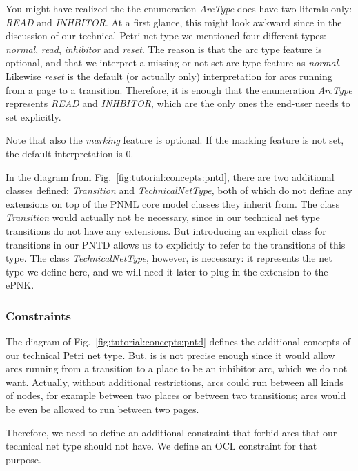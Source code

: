 You might have realized the the enumeration \emph{ArcType} does have two
literals only: \emph{READ} and \emph{INHBITOR}. At a first glance, this might
look awkward since in the discussion of our technical Petri net type we
mentioned four different types: \emph{normal}, \emph{read}, \emph{inhibitor} and
\emph{reset}. The reason is that the arc type feature is optional, and that we
interpret a missing or not set arc type feature as \emph{normal}. Likewise
\emph{reset} is the default (or actually only) interpretation for arcs
running from a page to a transition. Therefore, it is enough that the
enumeration \emph{ArcType} represents \emph{READ} and \emph{INHBITOR}, which are
the only ones the end-user needs to set explicitly.

Note that also the \emph{marking} feature is optional. If the marking feature
is not set, the default interpretation is $0$.

In the diagram from Fig.~\ref{fig:tutorial:concepts:pntd}, there are two
additional classes defined: \emph{Transition} and \emph{TechnicalNetType},
both of which do not define any extensions on top of the PNML core model
classes they inherit from. The class \emph{Transition} would actually not be
necessary, since in our technical net type transitions do not have any
extensions. But introducing an explicit class for transitions in our PNTD allows
us to explicitly to refer to the transitions of this type. The class
\emph{TechnicalNetType}, however, is necessary: it represents the net type we
define here, and we will need it later to plug in the extension to the ePNK.

\subsubsection{Constraints}
\label{subsubsec:tutorial:concepts:constraints}

The diagram of Fig.~\ref{fig:tutorial:concepts:pntd} defines the additional
concepts of our technical Petri net type. But, is is not precise enough since
it would allow arcs running from a transition to a place to be an inhibitor
arc, which we do not want. Actually, without additional restrictions, arcs
could run between all kinds of nodes, for example between two places or between
two transitions; arcs would be even be allowed to run between two pages.

Therefore, we need to define an additional constraint that forbid arcs that
our technical net type should not have. We define an OCL constraint for
that purpose. 

